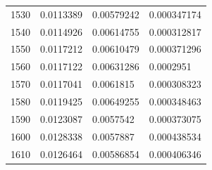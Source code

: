 \begin{center}
\begin{longtable}{l|l|l|l}
1530                                                   & 0.0113389                                                         & 0.00579242                                               & 0.000347174                                                        \\
1540                                                   & 0.0114926                                                         & 0.00614755                                               & 0.000312817                                                        \\
1550                                                   & 0.0117212                                                         & 0.00610479                                               & 0.000371296                                                        \\
1560                                                   & 0.0117122                                                         & 0.00631286                                               & 0.0002951                                                          \\
1570                                                   & 0.0117041                                                         & 0.0061815                                                & 0.000308323                                                        \\
1580                                                   & 0.0119425                                                         & 0.00649255                                               & 0.000348463                                                        \\
1590                                                   & 0.0123087                                                         & 0.0057542                                                & 0.000373075                                                        \\
1600                                                   & 0.0128338                                                         & 0.0057887                                                & 0.000438534                                                        \\
1610                                                   & 0.0126464                                                         & 0.00586854                                               & 0.000406346                                                        \\

\end{longtable}
\end{center}
